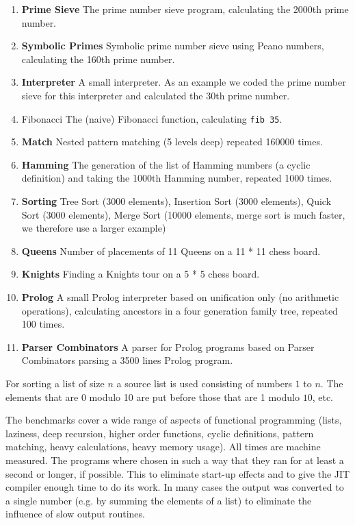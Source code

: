 \begin{enumerate}
\item {\bf \textsf{Prime Sieve}} The prime number sieve program, calculating the 2000th
prime number.
\item {\bf \textsf{Symbolic Primes}} Symbolic prime number sieve using Peano numbers,
calculating the 160th prime number.
\item {\bf \textsf{Interpreter}} A small \Sapl  interpreter. As an example we coded the prime
number sieve for this interpreter and calculated the 30th prime number.
\item { \textsf{Fibonacci}} The (naive) Fibonacci function, calculating \texttt{fib 35}.
\item {\bf \textsf{Match}} Nested pattern matching (5 levels deep) repeated 160000 times.
\item {\bf \textsf{Hamming}} The generation of the list of Hamming numbers (a cyclic
definition) and taking the 1000th Hamming number, repeated 1000 times.
\item {\bf \textsf{Sorting}} Tree Sort (3000 elements), Insertion Sort (3000 elements), Quick Sort (3000 elements), 
Merge Sort (10000 elements, merge sort is much faster, we therefore use a larger example)
\item {\bf \textsf{Queens}} Number of placements of 11 Queens on a 11 * 11 chess board.
\item {\bf \textsf{Knights}} Finding a Knights tour on a 5 * 5 chess board.
\item {\bf \textsf{Prolog}} A small Prolog interpreter based on unification only (no
arithmetic operations), calculating ancestors in a four generation family tree,
repeated 100 times.
\item {\bf \textsf{Parser Combinators}} A parser for Prolog programs based on Parser
Combinators parsing a 3500 lines Prolog program.
\end{enumerate}
%
For sorting a list of size $n$ a source list is  used consisting of numbers $1$
to $n$. The elements that are 0 modulo 10 are put before those that are 1 modulo
$10$, etc.

The benchmarks cover a wide range of aspects of functional programming (lists, laziness, 
deep recursion, higher order functions, cyclic definitions, pattern matching, 
heavy calculations, heavy memory usage).
All times are machine measured. The programs where chosen in such a way that
they ran for at least a second or longer, if possible. This to eliminate start-up 
effects and to give the \textsf{JIT} compiler enough time to do its work. 
In many cases the output was converted to a single number (e.g. 
by summing the elements of a list) to eliminate the influence of slow output 
routines.

